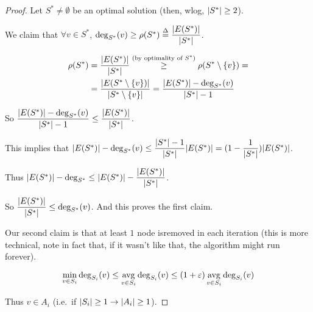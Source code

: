     \begin{proof}
        Let $S^* \neq \emptyset$ be an optimal solution (then, wlog, $\vert S^* \vert \geq 2$).

        We claim that $\forall v \in S^*$, $\deg_{S^*}(v) \geq \rho(S^*) \overset{\Delta}{=} \dfrac{\vert E(S^*) \vert}{\vert S^* \vert}$.


        \begin{equation*}
            \begin{split}
                \rho(S^*) &= \dfrac{\vert E(S^*) \vert}{\vert S^* \vert} \overset{(\text{by optimality of }S^*)}{\geq} \rho(S^* \setminus \{v\}) =\\
                    &= \dfrac{\vert E(S^* \setminus \{v\}) \vert}{\vert S^* \setminus \{v\} \vert} = \dfrac{\vert E(S^*) \vert - \deg_{S^*}(v)}{\vert S^* \vert-1}
            \end{split}
        \end{equation*}

        So $\dfrac{\vert E(S^*) \vert - \deg_{S^*}(v)}{\vert S^* \vert-1} \leq \dfrac{\vert E(S^*) \vert}{\vert S^* \vert}$.

        This implies that $\vert E(S^*) \vert - \deg_{S^*}(v) \leq \dfrac{\vert S^* \vert-1}{\vert S^* \vert} \vert E(S^*) \vert = (1 - \dfrac{1}{\vert S^* \vert}) \vert E(S^*) \vert$.

        Thus $\vert E(S^*) \vert - \deg_{S^*} \leq \vert E(S^*) \vert - \dfrac{\vert E(S^*) \vert }{\vert S^* \vert}$.

        So $\dfrac{\vert E(S^*) \vert }{\vert S^* \vert} \leq \deg_{S^*}(v)$. And this proves the first claim.

        Our second claim is that at least $1$ node isremoved in each iteration (this is more technical, note in fact that, if it wasn't like that, the algorithm might run forever).

        \[ \min_{v \in S_i} \deg_{S_i}(v) \leq \operatorname*{avg}_{v \in S_i} \deg_{S_i}(v) \leq (1+\varepsilon) \operatorname*{avg}_{v \in S_i} \deg_{S_i}(v) \]

        Thus $v \in A_i$ (i.e.~if $\vert S_i \vert \geq 1 \rightarrow \vert A_i \vert \geq 1$).


\end{proof}
